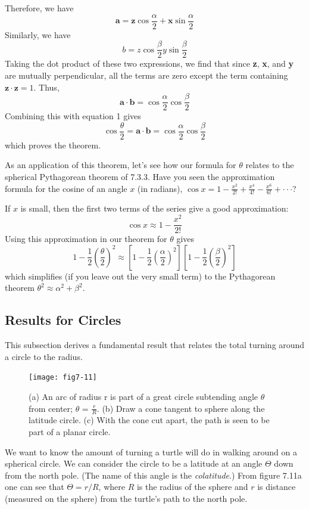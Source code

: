 \documentclass{book}
\begin{document}
Therefore, we have
$$ \mathbf{a} = \mathbf{z} \cos \frac {\alpha} {2} + \mathbf{x} \sin \frac {\alpha} {2} $$
 Similarly, we have
$$ b = z \cos \frac {\beta} {2} y \sin \frac {\beta} {2} $$
 Taking the dot product of these two expressions, we find that since \textbf{z},
\textbf{x}, and \textbf{y} are mutually perpendicular, all the terms are zero except the
term containing $\mathbf{z} \cdot \mathbf{z} = 1$. Thus,
$$ \mathbf{a} \cdot \mathbf{b} = \cos \frac {\alpha} {2} \cos \frac {\beta} {2} $$
 Combining this with equation 1 gives
$$ \cos \frac {\theta} {2} = \mathbf{a} \cdot \mathbf{b} = \cos \frac {\alpha} {2} \cos \frac {\beta} {2} $$
 which proves the theorem.

As an application of this theorem, let's see how our formula for $\theta$
relates to the spherical Pythagorean theorem of 7.3.3. Have you seen
the approximation formula for the cosine of an angle $x$ (in radians),
$ \cos x = 1 - \frac {x^2} {2!} + \frac {x^4} {4!} - \frac {x^6} {6!} + \cdot \cdot \cdot $?

If $x$ is small, then the first two terms of the series give a good approximation:
$$ \cos x \approx 1 - \frac {x^2} {2!} $$
 Using this approximation in our theorem for $\theta$ gives
$$ 1 - \frac{1}{2}(\frac{\theta}{2})^2 \approx [1 - \frac{1}{2}(\frac{\alpha}{2})^2][1 - \frac{1}{2}(\frac{\beta}{2})^2] $$
 which simplifies (if you leave out the very small term) to the
Pythagorean theorem $ \theta^2 \approx \alpha^2 + \beta^2 $.

\subsection{Results for Circles}

This subsection derives a fundamental result that relates the total turning around a circle to the radius.

\begin{figure}
\begin{center}
\texttt{[image: fig7-11]}
\caption{(a) An arc of radius r is part of a great circle subtending angle $\theta$ from center; $\theta$ = $\frac {r} {R}$. (b) Draw a cone tangent to sphere along the latitude circle. (c) With the cone cut apart, the path is seen to be part of a planar circle.}
\end{center}
\end{figure}

We want to know the amount of turning a turtle will do in walking
around on a spherical circle. We can consider the circle to be a latitude
at an angle $\Theta$ down from the north pole. (The name of this angle is the
{\em colatitude}.) From figure 7.11a one can see that $\Theta = r / R$, where $R$ is
the radius of the sphere and $r$ is distance (measured on the sphere) from
the turtle's path to the north pole.
\end{document}
